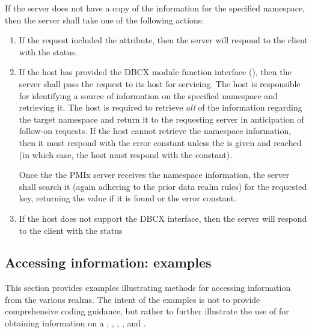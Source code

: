 If the server does not have a copy of the information for the specified
namespace, then the server shall take one of the following actions:
\begin{enumerate}
    \item If the request included the  attribute, then
    the server will respond to the client with the
     status.
    \item If the host has provided the \ac{DBCX} module function interface
    (), then the server shall pass the
    request to its host for servicing. The host is responsible for identifying
    a source of information on the specified namespace and retrieving it. The
    host is required to retrieve \emph{all} of the information regarding the target namespace
    and return it to the requesting server in anticipation of follow-on
    requests. If the host cannot retrieve the
    namespace information, then it must respond with the  error constant unless the  is given and reached (in which case, the host must respond with the  constant).

    Once the the \ac{PMIx} server receives the namespace information, the server shall search it (again adhering to the prior data realm rules) for the requested key, returning the value if it is found or the  error constant.
    \item If the host does not support the \ac{DBCX} interface, then the
    server will respond to the client with the 
    status
\end{enumerate}


\subsection{Accessing information: examples}
\label{chap:api_rsvd_keys:getex}

This section provides examples illustrating methods for accessing information from the various realms. The intent of the examples is not to provide comprehensive coding guidance, but rather to further illustrate the use of  for obtaining information on a , , , , and .


